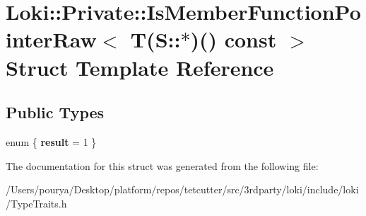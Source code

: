 \hypertarget{structLoki_1_1Private_1_1IsMemberFunctionPointerRaw_3_01T_07S_1_1_5_08_07_08_01const_01_01_4}{}\section{Loki\+:\+:Private\+:\+:Is\+Member\+Function\+Pointer\+Raw$<$ T(S\+:\+:$\ast$)() const $>$ Struct Template Reference}
\label{structLoki_1_1Private_1_1IsMemberFunctionPointerRaw_3_01T_07S_1_1_5_08_07_08_01const_01_01_4}
\subsection*{Public Types}
\begin{DoxyCompactItemize}
\item 
\hypertarget{structLoki_1_1Private_1_1IsMemberFunctionPointerRaw_3_01T_07S_1_1_5_08_07_08_01const_01_01_4_a0e40a0e72ccab2a8124f688a3e016315}{}enum \{ {\bfseries result} = 1
 \}\label{structLoki_1_1Private_1_1IsMemberFunctionPointerRaw_3_01T_07S_1_1_5_08_07_08_01const_01_01_4_a0e40a0e72ccab2a8124f688a3e016315}

\end{DoxyCompactItemize}


The documentation for this struct was generated from the following file\+:\begin{DoxyCompactItemize}
\item 
/\+Users/pourya/\+Desktop/platform/repos/tetcutter/src/3rdparty/loki/include/loki/Type\+Traits.\+h\end{DoxyCompactItemize}
